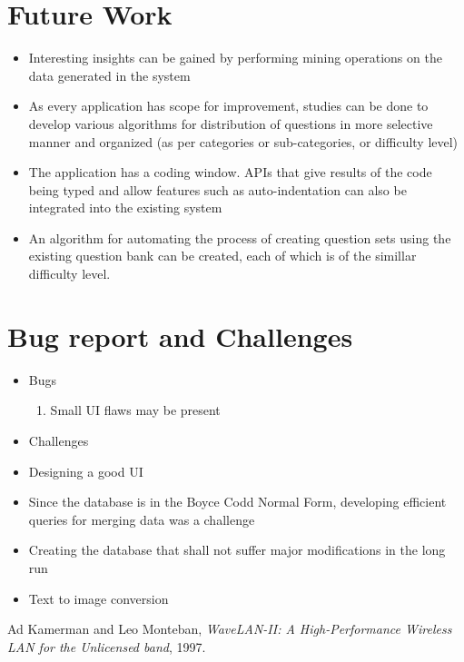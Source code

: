 \documentclass[a4paper,12pt,oneside]{book}
\begin{document}
\section{Future Work}
    \begin{itemize}
        \item Interesting insights can be gained by performing mining operations on the data generated in the system
        
        \item As every application has scope for improvement, studies can be done to develop various algorithms for distribution of questions in more selective manner and organized (as per categories or sub-categories, or difficulty level)
        
        \item The application has a coding window. APIs that give results of the code being typed and allow features such as auto-indentation can also be integrated into the existing system
        
        \item An algorithm for automating the process of creating question sets using the existing question bank can be created, each of which is of the simillar difficulty level.
    \end{itemize}

\section{Bug report and Challenges}
    \begin{itemize}
      \item Bugs
        \begin{enumerate}
          \item Small UI flaws may be present
        \end{enumerate}
      \item Challenges
           \item Designing a good UI
           \item Since the database is in the Boyce Codd Normal Form, developing efficient queries for merging data was a challenge
           \item Creating the database that shall not suffer major modifications in the long run
           \item Text to image conversion
    \end{itemize}

\begin{thebibliography}{li}
Ad Kamerman and Leo Monteban,
{\em WaveLAN-II: A High-Performance Wireless LAN for the Unlicensed band},
1997.

\end{thebibliography}
\end{document}
